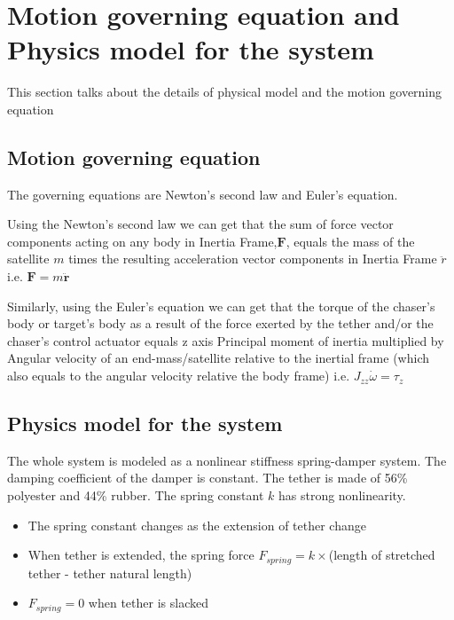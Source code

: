 \section{Motion governing equation and Physics model for the system}

This section talks about the details of physical model and the motion governing equation

\subsection{Motion governing equation}

The governing equations are Newton's second law and Euler's equation.

Using the Newton's second law we can get that the sum of force vector components acting on any body in Inertia Frame,$\mathbf{F}$, equals the mass of the satellite $m$ times the resulting acceleration vector components in Inertia Frame $\ddot{r}$ i.e. $ \mathbf{F} = m\mathbf{\ddot{r}}$

Similarly, using the Euler's equation we can get that the torque of the chaser's body or target's body as a result of the force exerted by the tether and/or the chaser's control actuator equals z axis Principal moment of inertia multiplied by Angular velocity of an end-mass/satellite relative to the inertial frame (which also equals to the angular velocity relative the body frame) i.e. $J_{zz} \dot{\omega} = \tau_z$ 

\subsection{Physics model for the system}

The whole system is modeled as a nonlinear stiffness spring-damper system. The damping coefficient of the damper is constant. The tether is made of 56\% polyester and 44\% rubber. The spring constant $k$ has strong nonlinearity. 

\begin{itemize}

\item The spring constant changes as the extension of tether change 

\item When tether is extended, the spring force $F_{spring} = k\times $(length of stretched tether - tether natural length)

\item $F_{spring} = 0$ when tether is slacked

\end{itemize}


